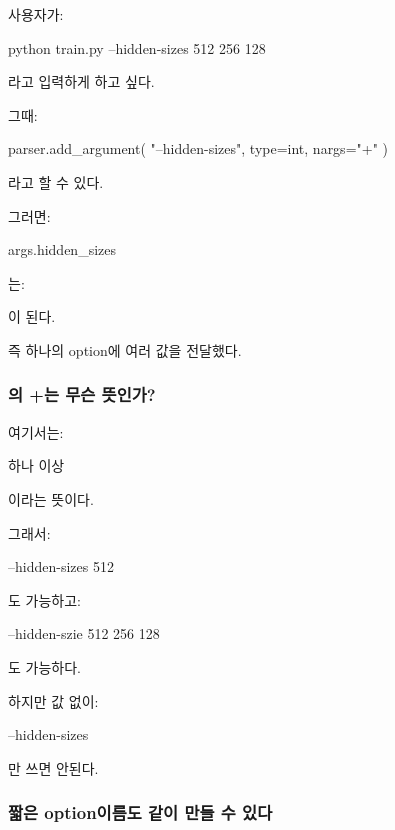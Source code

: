 사용자가:

\begin{dhkzsh}
python train.py --hidden-sizes 512 256 128
\end{dhkzsh}

라고 입력하게 하고 싶다.

그때:

\begin{dhkcode}
parser.add_argument(
    "--hidden-sizes",
    type=int,
    nargs="+"
)
\end{dhkcode}

라고 할 수 있다.

그러면:

\begin{dhkcode}
args.hidden_sizes
\end{dhkcode}

는:

\begin{dhkzsh}
[512, 256, 128]
\end{dhkzsh}

이 된다.

즉 하나의 option에 여러 값을 전달했다.

\subsubsection{의 +는 무슨 뜻인가?}

여기서는:

\begin{dhksmry}[centered]
하나 이상
\end{dhksmry}

이라는 뜻이다.

그래서:

\begin{dhkzsh}
--hidden-sizes 512
\end{dhkzsh}

도 가능하고:

\begin{dhkzsh}
--hidden-szie 512 256 128
\end{dhkzsh}

도 가능하다.

하지만 값 없이:

\begin{dhkzsh}
--hidden-sizes
\end{dhkzsh}

만 쓰면 안된다.

\subsubsection{짧은 option이름도 같이 만들 수 있다}

